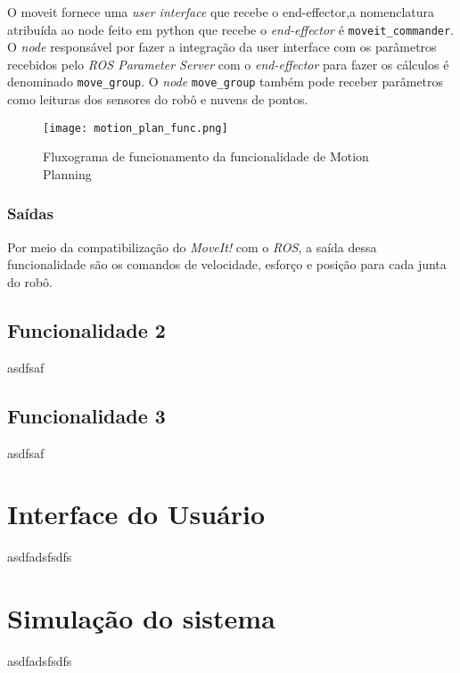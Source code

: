 O moveit fornece uma \textit{user interface} que recebe o end-effector,a nomenclatura atribuída ao node feito em python que recebe o \textit{end-effector} é \verb|moveit_commander|. O  \textit{node} responsável por fazer a integração da user interface com os parâmetros recebidos pelo \textit{ROS Parameter Server} com o \textit{end-effector} para fazer os cálculos é denominado \verb|move_group|. O \textit{node} \verb|move_group| também pode receber parâmetros como leituras dos sensores do robô e nuvens de pontos.

\begin{figure}[h]
	\centering
	\texttt{[image: motion\_plan\_func.png]}
	\caption{Fluxograma de funcionamento da funcionalidade de Motion Planning}
	\label{fig:flux_motion}
\end{figure}

\subsubsection{Saídas}
Por meio da compatibilização do \textit{MoveIt!} com o \textit{ROS}, a saída dessa funcionalidade são os comandos de velocidade, esforço e posição para cada junta do robô.

\subsection{Funcionalidade 2}
\label{ssec:func2}
asdfsaf

\subsection{Funcionalidade 3}
\label{ssec:func3}
asdfsaf

\section{Interface do Usuário}
\label{sec:ui}
asdfadsfsdfs

\section{Simulação do sistema}
\label{sec:sim}
asdfadsfsdfs


